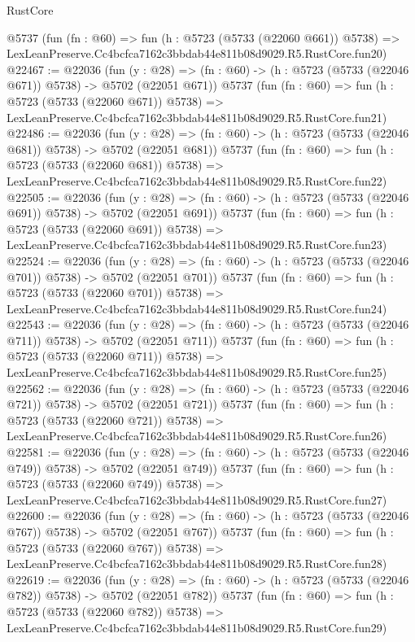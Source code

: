 \begin{lexlean}{RustCore}
\begin{coremodule}
    @5737
    (fun (fn : @60) =>
    fun (h : @5723 (@5733 (@22060 @661)) @5738) =>
    LexLeanPreserve.Cc4bcfca7162c3bbdab44e811b08d9029.R5.RustCore.fun20)
@22467 := @22036
    (fun (y : @28) => (fn : @60) -> (h : @5723 (@5733 (@22046 @671)) @5738) -> @5702 (@22051 @671))
    @5737
    (fun (fn : @60) =>
    fun (h : @5723 (@5733 (@22060 @671)) @5738) =>
    LexLeanPreserve.Cc4bcfca7162c3bbdab44e811b08d9029.R5.RustCore.fun21)
@22486 := @22036
    (fun (y : @28) => (fn : @60) -> (h : @5723 (@5733 (@22046 @681)) @5738) -> @5702 (@22051 @681))
    @5737
    (fun (fn : @60) =>
    fun (h : @5723 (@5733 (@22060 @681)) @5738) =>
    LexLeanPreserve.Cc4bcfca7162c3bbdab44e811b08d9029.R5.RustCore.fun22)
@22505 := @22036
    (fun (y : @28) => (fn : @60) -> (h : @5723 (@5733 (@22046 @691)) @5738) -> @5702 (@22051 @691))
    @5737
    (fun (fn : @60) =>
    fun (h : @5723 (@5733 (@22060 @691)) @5738) =>
    LexLeanPreserve.Cc4bcfca7162c3bbdab44e811b08d9029.R5.RustCore.fun23)
@22524 := @22036
    (fun (y : @28) => (fn : @60) -> (h : @5723 (@5733 (@22046 @701)) @5738) -> @5702 (@22051 @701))
    @5737
    (fun (fn : @60) =>
    fun (h : @5723 (@5733 (@22060 @701)) @5738) =>
    LexLeanPreserve.Cc4bcfca7162c3bbdab44e811b08d9029.R5.RustCore.fun24)
@22543 := @22036
    (fun (y : @28) => (fn : @60) -> (h : @5723 (@5733 (@22046 @711)) @5738) -> @5702 (@22051 @711))
    @5737
    (fun (fn : @60) =>
    fun (h : @5723 (@5733 (@22060 @711)) @5738) =>
    LexLeanPreserve.Cc4bcfca7162c3bbdab44e811b08d9029.R5.RustCore.fun25)
@22562 := @22036
    (fun (y : @28) => (fn : @60) -> (h : @5723 (@5733 (@22046 @721)) @5738) -> @5702 (@22051 @721))
    @5737
    (fun (fn : @60) =>
    fun (h : @5723 (@5733 (@22060 @721)) @5738) =>
    LexLeanPreserve.Cc4bcfca7162c3bbdab44e811b08d9029.R5.RustCore.fun26)
@22581 := @22036
    (fun (y : @28) => (fn : @60) -> (h : @5723 (@5733 (@22046 @749)) @5738) -> @5702 (@22051 @749))
    @5737
    (fun (fn : @60) =>
    fun (h : @5723 (@5733 (@22060 @749)) @5738) =>
    LexLeanPreserve.Cc4bcfca7162c3bbdab44e811b08d9029.R5.RustCore.fun27)
@22600 := @22036
    (fun (y : @28) => (fn : @60) -> (h : @5723 (@5733 (@22046 @767)) @5738) -> @5702 (@22051 @767))
    @5737
    (fun (fn : @60) =>
    fun (h : @5723 (@5733 (@22060 @767)) @5738) =>
    LexLeanPreserve.Cc4bcfca7162c3bbdab44e811b08d9029.R5.RustCore.fun28)
@22619 := @22036
    (fun (y : @28) => (fn : @60) -> (h : @5723 (@5733 (@22046 @782)) @5738) -> @5702 (@22051 @782))
    @5737
    (fun (fn : @60) =>
    fun (h : @5723 (@5733 (@22060 @782)) @5738) =>
    LexLeanPreserve.Cc4bcfca7162c3bbdab44e811b08d9029.R5.RustCore.fun29)

\end{coremodule}
\end{lexlean}
